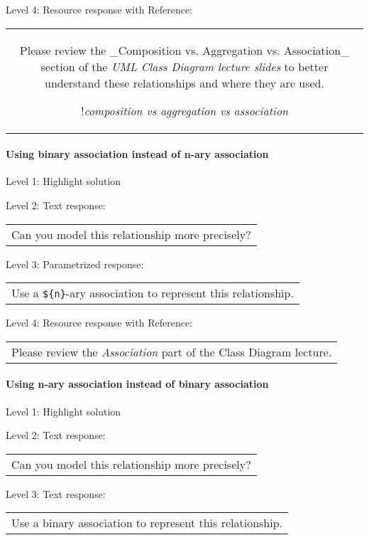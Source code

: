 \noindent Level 4: Resource response with Reference:

\begin{tabular}{|c}
Please review the _Composition vs. Aggregation vs. Association_ section of 
the \textit{UML Class Diagram lecture slides} to 
better understand these relationships and where they are used.

!\textit{composition vs aggregation vs association}
\end{tabular} \medskip


\paragraph{Using binary association instead of n-ary association}

\noindent Level 1: Highlight solution \medskip

\noindent Level 2: Text response: \medskip

\begin{tabular}{|c}
Can you model this relationship more precisely?
\end{tabular} \medskip

\noindent Level 3: Parametrized response: \medskip

\begin{tabular}{|c}
Use a \verb|${n}|-ary association to represent this relationship.
\end{tabular} \medskip

\noindent Level 4: Resource response with Reference:

\begin{tabular}{|c}
Please review the \textit{Association} part of the Class Diagram lecture.
\end{tabular} \medskip


\paragraph{Using n-ary association instead of binary association}

\noindent Level 1: Highlight solution \medskip

\noindent Level 2: Text response: \medskip

\begin{tabular}{|c}
Can you model this relationship more precisely?
\end{tabular} \medskip

\noindent Level 3: Text response: \medskip

\begin{tabular}{|c}
Use a binary association to represent this relationship.
\end{tabular} \medskip

